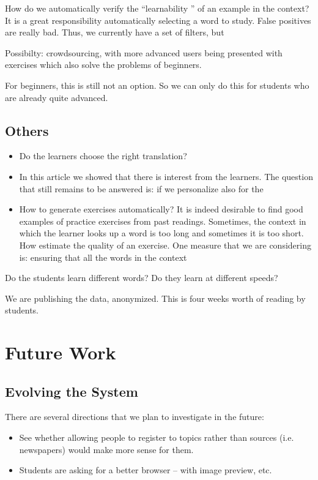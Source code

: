 How do we automatically verify the ``learnability '' of an example in the context? It is a great responsibility automatically selecting a word to study. False positives are really bad. Thus, we currently have a set of filters, but 

Possibilty: crowdsourcing, with more advanced users being presented with exercises which also solve the problems of beginners. 

For beginners, this is still not an option. So we can only do this for students who are already quite advanced. 





\subsection{Others}
\begin{itemize}
	\item Do the learners choose the right translation? 
	\item In this article we showed that there is interest from the learners. The question that still remains to be answered is: if we personalize also for the 
	\item How to generate exercises automatically? It is indeed desirable to find good examples of practice exercises from past readings. Sometimes, the context in which the learner looks up a word is too long and sometimes it is too short. How estimate the quality of an exercise. One measure that we are considering is: ensuring that all the words in the context  
\end{itemize}

Do the students learn different words? Do they learn at different speeds? 

We are publishing the data, anonymized. This is four weeks worth of reading by \stcnt students.


\section{Future Work}


\subsection{Evolving the System}
There are several directions that we plan to investigate in the future: 

\begin{itemize}

	\item See whether allowing people to register to topics rather than sources (i.e. newspapers) would make more sense for them. 

	\item Students are asking for a better browser -- with image preview, etc.

\end{itemize}


